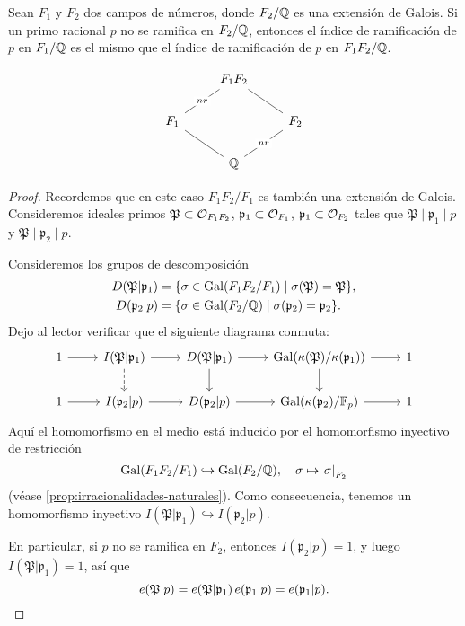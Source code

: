 \begin{lema}
  Sean $F_1$ y $F_2$ dos campos de números, donde $F_2/\mathbb{Q}$ es una extensión de
  Galois. Si un primo racional $p$ no se ramifica en $F_2/\mathbb{Q}$, entonces
  el índice de ramificación de $p$ en $F_1/\mathbb{Q}$ es el mismo que el índice
  de ramificación de $p$ en $F_1 F_2/\mathbb{Q}$.

  \[ \begin{tikzcd}
    & F_1 F_2\ar[-]{dl}[description]{nr}\ar[-]{dr} \\
    F_1\ar[-]{dr} & & F_2\ar[-]{dl}[description]{nr} \\
    & \QQ
  \end{tikzcd} \]

  \begin{proof}
    Recordemos que en este caso $F_1 F_2/F_1$ es también una extensión de
    Galois. Consideremos ideales primos
    $\mathfrak{P} \subset \mathcal{O}_{F_1 F_2}$,
    $\mathfrak{p}_1 \subset \mathcal{O}_{F_1}$,
    $\mathfrak{p}_1 \subset \mathcal{O}_{F_2}$
    tales que
    $\mathfrak{P} \mid \mathfrak{p}_1 \mid p$ y
    $\mathfrak{P} \mid \mathfrak{p}_2 \mid p$.

    Consideremos los grupos de descomposición
    \begin{align*}
      D (\mathfrak{P}|\mathfrak{p}_1) & = \{ \sigma \in \operatorname{Gal} (F_1 F_2/F_1) \mid \sigma (\mathfrak{P}) = \mathfrak{P} \}, \\
      D (\mathfrak{p}_2|p) & = \{ \sigma \in \operatorname{Gal} (F_2/\mathbb{Q}) \mid \sigma (\mathfrak{p}_2) = \mathfrak{p}_2 \}.
    \end{align*}
    Dejo al lector verificar que el siguiente diagrama conmuta:
    \[ \begin{tikzcd}
      1 \ar{r} & I (\mathfrak{P}|\mathfrak{p}_1)\ar[dashed]{d}\ar{r} & D (\mathfrak{P}|\mathfrak{p}_1) \ar{r}\ar{d} & \Gal (\kappa(\mathfrak{P})/\kappa(\mathfrak{p}_1)) \ar{r}\ar{d} & 1 \\
      1 \ar{r} & I (\mathfrak{p}_2|p)\ar{r} & D (\mathfrak{p}_2|p) \ar{r} & \Gal (\kappa(\mathfrak{p}_2)/\FF_p) \ar{r} & 1
    \end{tikzcd} \]
    Aquí el homomorfismo en el medio está inducido por el homomorfismo
    inyectivo de restricción
    \[ \operatorname{Gal} (F_1 F_2/F_1) \hookrightarrow \operatorname{Gal} (F_2/\mathbb{Q}),
    \quad \sigma \mapsto \left.\sigma\right|_{F_2} \]
    (véase \ref{prop:irracionalidades-naturales}). Como consecuencia, tenemos
    un homomorfismo inyectivo
    $I (\mathfrak{P}|\mathfrak{p}_1) \hookrightarrow I (\mathfrak{p}_2|p)$.

    En particular, si $p$ no se ramifica en $F_2$, entonces
    $I (\mathfrak{p}_2|p) = 1$, y luego $I (\mathfrak{P}|\mathfrak{p}_1) = 1$,
    así que
    \[ e (\mathfrak{P}|p) =
       e (\mathfrak{P}|\mathfrak{p}_1)\,e (\mathfrak{p}_1|p) =
       e (\mathfrak{p}_1|p). \qedhere\]
  \end{proof}
\end{lema}

